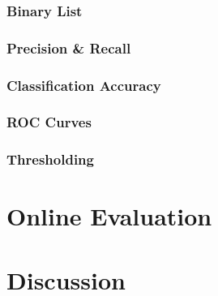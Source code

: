 \subsubsection{Binary List}

\subsubsection{Precision \& Recall}

\subsubsection{Classification Accuracy}

\subsubsection{ROC Curves}

\subsubsection{Thresholding}

\section{Online Evaluation}


\section{Discussion}


